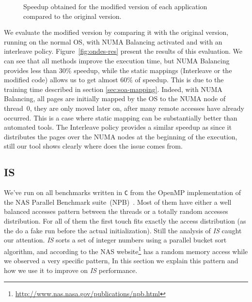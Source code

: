 \begin{figure}[htb]
    \centering
    \caption{Speedup obtained for the modified version of each application
    compared to the original version.}
\end{figure}

We evaluate the modified version by comparing it with the original
version, running on the normal OS, with NUMA Balancing activated and with an
interleave policy. Figure~\ref{fig:ondes-res} present the results of this
evaluation. We can see that all methods improve the execution time, but
NUMA Balancing provides less than $30\%$ speedup, while the static mappings
(Interleave or the modified code) allows us to get almost $60\%$ of speedup. This is
due to the training time described in section \ref{sec:soa-mapping}. Indeed,
with NUMA Balancing, all pages are initially mapped by the OS to the NUMA node
of thread~$0$, they
are only moved later on, after many remote accesses have already occurred. This is a case where static mapping can be substantially better than automated
tools. The Interleave policy provides a similar speedup as
\TABARNAC since it distributes the pages over the NUMA nodes at the beginning of
the execution, still our tool shows clearly where does the issue comes from.


\subsection{IS}
\label{sec:exp-is}


We've run \TABARNAC on all benchmarks written in \texttt{C} from the OpenMP
implementation of the NAS Parallel Benchmark suite~(NPB)~\cite{Jin1999}. Most
of them have either a well balanced accesses pattern between the threads or a
totally random accesses distribution. For all of them the first touch fits exactly
the access distribution (as the do a fake run before the actual
initialization). Still the analysis of \emph{IS} caught our attention.
\emph{IS} sorts a set of integer numbers using a parallel bucket sort
algorithm, and according to the NAS
website\footnote{\url{http://www.nas.nasa.gov/publications/npb.html}} has a
random memory access while we observed a very specific pattern, In this
section we explain this pattern and how we use it to improve on \emph{IS}
performance.

